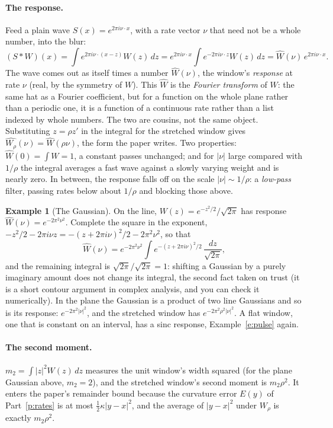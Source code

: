 \documentclass[10pt]{article}
\theoremstyle{plain}
\theoremstyle{definition}
\newtheorem{example}[fact]{Example}
\begin{document}
\paragraph{The response.}
Feed a plain wave $S(x)=e^{2\pi i\nu\cdot x}$, with a rate vector $\nu$
that need not be a whole number, into the blur:
\[
  (S*W)(x)=\int e^{2\pi i\nu\cdot(x-z)}W(z)\,dz=e^{2\pi i\nu\cdot x}\int e^{-2\pi i\nu\cdot z}W(z)\,dz
  =\widehat W(\nu)\,e^{2\pi i\nu\cdot x}.
\]
The wave comes out as itself times a number $\widehat W(\nu)$, the window's
\emph{response} at rate $\nu$ (real, by the symmetry of $W$). This
$\widehat W$ is the \emph{Fourier transform} of $W$: the same hat as a
Fourier coefficient, but for a function on the whole plane rather than a
periodic one, it is a function of a continuous rate rather than a list
indexed by whole numbers. The two are cousins, not the same object.
Substituting $z=\rho z'$ in the integral for the stretched window gives
$\widehat{W_\rho}(\nu)=\widehat W(\rho\nu)$, the form the paper writes. Two
properties: $\widehat W(0)=\int W=1$, a constant passes unchanged; and for
$|\nu|$ large compared with $1/\rho$ the integral averages a fast wave
against a slowly varying weight and is nearly zero. In between, the
response falls off on the scale $|\nu|\sim1/\rho$: a \emph{low-pass}
filter, passing rates below about $1/\rho$ and blocking those above.

\begin{example}[The Gaussian]
On the line, $W(z)=e^{-z^2/2}/\sqrt{2\pi}$ has response
$\widehat W(\nu)=e^{-2\pi^2\nu^2}$. Complete the square in the exponent,
$-z^2/2-2\pi i\nu z=-(z+2\pi i\nu)^2/2-2\pi^2\nu^2$, so that
\[
  \widehat W(\nu)=e^{-2\pi^2\nu^2}\int e^{-(z+2\pi i\nu)^2/2}\,\frac{dz}{\sqrt{2\pi}},
\]
and the remaining integral is $\sqrt{2\pi}/\sqrt{2\pi}=1$: shifting a Gaussian by a
purely imaginary amount does not change its integral, the second fact
taken on trust (it is a short contour argument in complex analysis, and you
can check it numerically). In the plane the Gaussian is a product of two
line Gaussians and so is its response: $e^{-2\pi^2|\nu|^2}$, and the
stretched window has $e^{-2\pi^2\rho^2|\nu|^2}$. A flat window, one that is
constant on an interval, has a sinc response, Example~\ref{e:pulse} again.
\end{example}

\paragraph{The second moment.}
$m_2=\int|z|^2W(z)\,dz$ measures the unit window's width squared (for the
plane Gaussian above, $m_2=2$), and the stretched window's second moment
is $m_2\rho^2$. It enters the paper's remainder bound because the
curvature error $E(y)$ of Part~\ref{p:rates} is at most $\tfrac12\kappa|y-x|^2$,
and the average of $|y-x|^2$ under $W_\rho$ is exactly $m_2\rho^2$.
\end{document}
